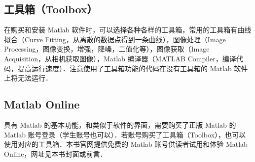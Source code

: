 \subsection{工具箱（Toolbox）}
在购买和安装 Matlab 软件时，可以选择各种各样的工具箱，常用的工具箱有曲线拟合（Curve Fitting，从离散的数据点得到一条曲线），图像处理（Image Processing，图像变换，增强，降噪，二值化等），图像获取（Image Acquisition，从相机获取图像），Matlab 编译器（MATLAB Compiler，编译代码，提高运行速度）．注意使用了工具箱功能的代码在没有工具箱的 Matlab 软件上将无法运行．

\subsection{Matlab Online}
具有 Matlab 的基本功能，和类似于软件的界面，需要购买了正版 Matlab 的 Matlab 账号登录（学生账号也可以）．若账号购买了工具箱（Toolbox），也可以使用对应的工具箱．本书官网提供免费的 Matlab 账号供读者试用和体验 Matlab Online，网址见本书封面或前言．



